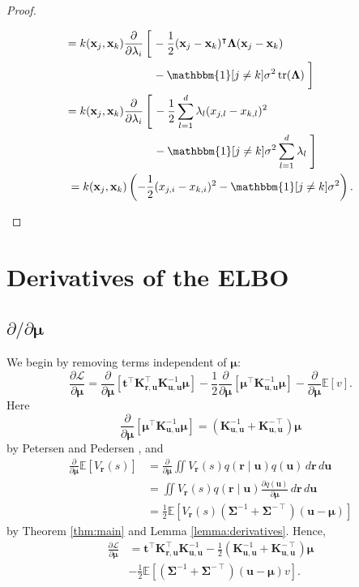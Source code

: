 \documentclass{mpaper}
\DeclareMathOperator{\tr}{tr}
\newcommand{\V}{V_{\mathbf{r}}}
\newcommand{\dx}{\,d\mathbf{r}\,d\mathbf{u}}
\newcommand{\Kuu}{\mathbf{K}_{\mathbf{u},\mathbf{u}}}
\newcommand{\Kru}{\mathbf{K}_{\mathbf{r},\mathbf{u}}}
\newcommand{\dm}{\frac{\partial}{\partial\bm\mu}}
\newcommand{\dl}{\frac{\partial}{\partial \lambda_i}}
\begin{document}
\begin{proof}
\begin{enumerate}
\begin{enumerate}
\begin{align*}
      &\begin{aligned}
        = k(\mathbf{x}_j, \mathbf{x}_k) \dl \left[ \vphantom{\frac{1}{2}} \right. &-\frac{1}{2}(\mathbf{x}_j - \mathbf{x}_k)^\intercal \bm\Lambda (\mathbf{x}_j - \mathbf{x}_k) \\
        &- \mathbbm{1}[j \ne k]\sigma^2\tr(\bm\Lambda) \left. \vphantom{\frac{1}{2}} \right]
      \end{aligned} \\
      &\begin{aligned}
        = k(\mathbf{x}_j, \mathbf{x}_k) \dl \left[ \vphantom{\sum_{k=1}^d} \right. &-\frac{1}{2} \sum_{l=1}^d \lambda_l (x_{j,l} - x_{k,l})^2 \\
        &- \mathbbm{1}[j \ne k]\sigma^2\sum_{l=1}^d \lambda_l \left. \vphantom{\sum_{l=1}^d} \right]
      \end{aligned} \\
      &= k(\mathbf{x}_j, \mathbf{x}_k) \left( -\frac{1}{2}(x_{j,i} - x_{k,i})^2 - \mathbbm{1}[j \ne k]\sigma^2 \right).
    \end{align*}
    \end{enumerate}
  \end{enumerate}
\end{proof}

\section{Derivatives of the ELBO}

\subsection{\texorpdfstring{$\partial/\partial\bm\mu$}{Derivative w.r.t. mu}}

We begin by removing terms independent of $\bm\mu$:
\[
  \frac{\partial\mathcal{L}}{\partial\bm\mu} =
  \dm[\mathbf{t}^\intercal\Kru^\intercal\Kuu^{-1}\bm\mu] - \frac{1}{2} \dm
  \left[ \bm\mu^\intercal \Kuu^{-1} \bm\mu \right] - \dm\mathbb{E}[v].
\]
Here
\[
  \dm \left[ \bm\mu^\intercal \Kuu^{-1} \bm\mu \right] = (\Kuu^{-1} +
  \Kuu^{-\intercal}) \bm\mu
\]
by Petersen and Pedersen \cite{petersen2008matrix}, and
\[
  \begin{split}
    \dm\mathbb{E}[\V(s)] &= \dm\iint \V(s) q(\mathbf{r} \mid \mathbf{u})
    q(\mathbf{u})\dx \\
    &= \iint \V(s) q(\mathbf{r} \mid \mathbf{u}) \frac{\partial
      q(\mathbf{u})}{\partial \bm\mu}\dx \\
    &= \frac{1}{2}\mathbb{E}[\V(s) (\bm\Sigma^{-1} +
    \bm\Sigma^{-\intercal})(\mathbf{u} - \bm\mu)]
  \end{split}
\]
by Theorem \ref{thm:main} and Lemma \ref{lemma:derivatives}. Hence,
\[
  \begin{split}
    \frac{\partial\mathcal{L}}{\partial\bm\mu} &=
    \mathbf{t}^\intercal\Kru^\intercal\Kuu^{-1} - \frac{1}{2} (\Kuu^{-1} +
    \Kuu^{-\intercal}) \bm\mu \\
    &- \frac{1}{2}\mathbb{E} \left[(\bm\Sigma^{-1} +
      \bm\Sigma^{-\intercal})(\mathbf{u} - \bm\mu) v \right].
  \end{split}
\]
\end{document}
